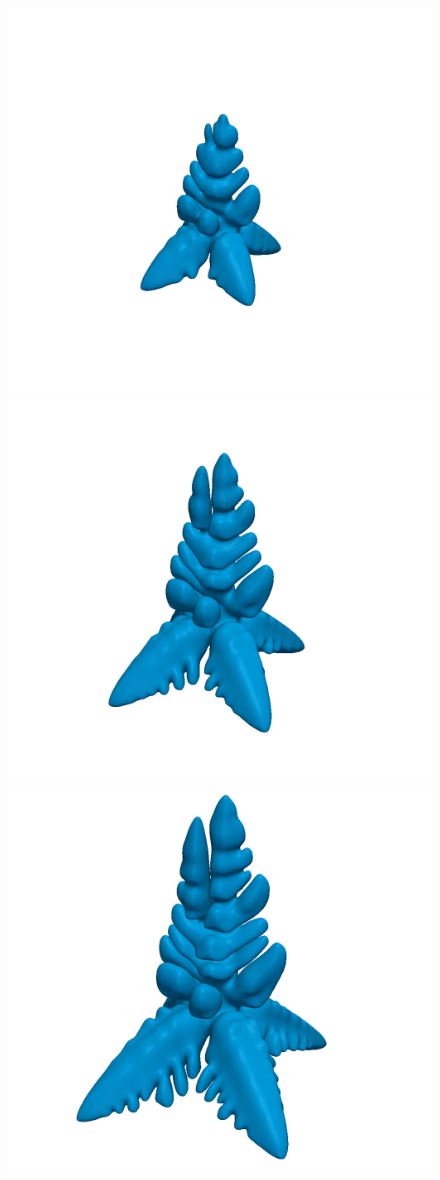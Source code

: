 \begin{figure}[ht!]
\begin{center}
{\includegraphics[width=.24\textwidth]{stefan/nb5_iter39.png}
\includegraphics[width=.24\textwidth]{stefan/nb5_iter59.png}
\includegraphics[width=.24\textwidth]{stefan/nb5_iter79.png}
}
\end{center}
\end{figure}

